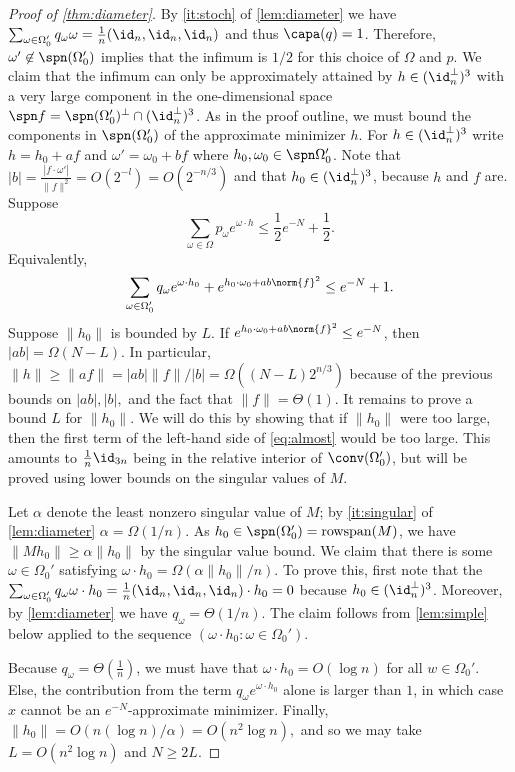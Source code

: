 \begin{proof}[Proof of \cref{thm:diameter}]
By \cref{it:stoch} of \cref{lem:diameter} we have $\sum_{\omega \in \Omega_0'} q_\omega \omega = \frac{1}{n}(\id_n, \id_n, \id_n)$ and thus $\capa(q) = 1$. Therefore, $\omega' \not\in \spn(\Omega_0')$ implies that the infimum is $1/2$ for this choice of $\Omega$ and $p$. We claim that the infimum can only be approximately attained by $h \in (\id_n^\perp)^3$ with a very large component in the one-dimensional space $\spn f = \spn(\Omega_0')^\perp \cap (\id_n^\perp)^3$. As in the proof outline, we must bound the components in $\spn(\Omega_0')$ of the approximate minimizer $h$. For $h \in (\id_n^\perp)^3$ write $h = h_0 + a f$ and $\omega' = \omega_0 + bf$ where $h_0, \omega_0 \in \spn \Omega_0'$. Note that $|b| = \frac{|f \cdot \omega'|}{\|f\|^2} = O(2^{-l}) =  O(2^{-n/3})$ and that $h_0 \in (\id_n^\perp)^3$, because $h$ and $f$ are.
Suppose 
$$ \sum_{\omega \in \Omega} p_{\omega} e^{\omega \cdot h} \leq \frac{1}{2}e^{-N} + \frac{1}{2}.$$
Equivalently, 
\begin{align}
 \sum_{\omega \in \Omega_0'} q_{\omega} e^{\omega \cdot h_0} +  e^{h_0\cdot \omega_0 + a b \norm{f}^2} \leq e^{-N} + 1.\label{eq:almost}
\end{align}
Suppose $\|h_0\|$ is bounded by $L$. If $e^{h_0\cdot \omega_0 + ab \norm{f}^2 } \leq e^{-N}$, then $|a b| =  \Omega(N - L)$. In particular, $\|h\| \geq \|af\| =\vert a b \vert \|f\| / \vert b \vert= \Omega ((N - L)2^{n/3})$ because of the previous bounds on $|ab|, |b|,$ and the fact that $\|f\| = \Theta(1)$. It remains to prove a bound $L$ for $\|h_0\|$. We will do this by showing that if $\|h_0\|$ were too large, then the first term of the left-hand side of \cref{eq:almost} would be too large. This amounts to $\frac{1}{n}\id_{3n}$ being in the relative interior of $\conv(\Omega_0')$, but will be proved using lower bounds on the singular values of $M$.

Let $\alpha$ denote the least nonzero singular value of $M$; by \cref{it:singular} of \cref{lem:diameter} $\alpha = \Omega( 1/n)$. As $h_0 \in \spn(\Omega_0') =\operatorname{rowspan}(M)$, we have $\|M h_0\| \geq \alpha \|h_0\|$ by the singular value bound. We claim that there is some $\omega \in \Omega_0'$ satisfying $\omega \cdot h_0 = \Omega(\alpha \|h_0\|/n)$. To prove this, first note that the $\sum_{\omega \in \Omega_0'} q_{\omega} \omega \cdot h_0 = \frac{1}{n}(\id_n, \id_n, \id_n) \cdot h_0 = 0$ because $h_0 \in  (\id_n^\perp)^3$. Moreover, by \cref{lem:diameter} we have $q_{\omega} = \Theta(1/n)$. The claim follows from \cref{lem:simple} below applied to the sequence $(\omega \cdot h_0: \omega \in \Omega_0').$


Because $q_\omega=\Theta(\frac{1}{n})$, we must have that $\omega \cdot h_0 = O(\log n)$ for all $w \in \Omega_0'$. Else, the contribution from the term $q_\omega e^{\omega \cdot h_0}$ alone is larger than $1$, in which case $x$ cannot be an $e^{- N}$-approximate minimizer. Finally, $\|h_0\| = O(n(\log n)/\alpha) = O(n^{2}\log n),$ and so we may take $L = O(n^{2}\log n)$ and $N \geq 2L$. \end{proof}

